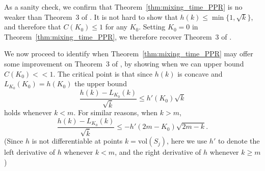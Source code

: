 \documentclass[11pt,twoside]{article}
\newcommand{\vol}{\mathrm{vol}}
\newcommand{\1}{\mathbf{1}}
\begin{document}
As a sanity check, we confirm that Theorem~\ref{thm:mixing_time_PPR} is no weaker than Theorem~3 of \citet{andersen2006}. It is not hard to show that $h(k) \leq \min\{1,\sqrt{k}\}$, and therefore that $C(K_0) \leq 1$ for any $K_0$. Setting $K_0 = 0$ in Theorem~\ref{thm:mixing_time_PPR}, we therefore recover Theorem~3 of \citet{andersen2006}.

We now proceed to identify when Theorem~\ref{thm:mixing_time_PPR} may offer some improvement on Theorem~3 of \citet{andersen2006}, by showing when we can upper bound $C(K_0) << 1$. The critical point is that since $h(k)$ is concave and $L_{K_0}(K_0) = h(K_0)$ the upper bound
\begin{equation*}
\frac{h(k) - L_{K_0}(k)}{\sqrt{\overline{k}}} \leq h'(K_0) \sqrt{k}
\end{equation*}
holds whenever $k < m$. For similar reasons, when $k > m$, 
\begin{equation*}
\frac{h(k) - L_{K_0}(k)}{\sqrt{\overline{k}}} \leq -h'(2m - K_0) \sqrt{2m - k}.
\end{equation*} 
(Since $h$ is not differentiable at points $k = \vol(S_j)$, here we use $h'$ to denote the left derivative of $h$ whenever $k < m$, and the right derivative of $h$ whenever $k \geq m$)  
\end{document}
